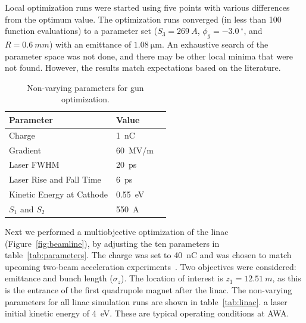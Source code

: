 Local optimization runs were started using five points 
with various 
differences from the optimum value. The optimization runs converged 
(in less than 100 function evaluations) to a parameter set ($S_3=\SI{269}{A}$,
$\phi_g=\SI{-3.0}{^{\circ}}$, and $R=\SI{0.6}{mm}$) with an emittance of $\SI{1.08}{\um}$.
An exhaustive search of the parameter space was not done, and there may be other local minima that were not found.
However, the results match expectations based on the literature. 
\begin{table}%
	\caption{\label{tab:gun} Non-varying parameters for gun optimization.}
	\begin{center}
		\begin{tabular}{lll}
			\toprule
			\textbf{Parameter} & \textbf{Value} \\
			\midrule
			Charge  & \SI{1}{nC} \\
			Gradient & \SI{60}{MV/m} \\
			Laser FWHM & \SI{20}{ps} \\
			Laser Rise and Fall Time & \SI{6}{ps} \\
			Kinetic Energy at Cathode  & \SI{0.55}{eV} \\
			$S_1$ and $S_2$ & \SI{550}{A} \\
			\bottomrule
		\end{tabular}
	\end{center}
\end{table}

\label{sec:linacopt}
Next we performed a multiobjective optimization of the linac (Figure~\ref{fig:beamline}), 
by adjusting the ten parameters in table~\ref{tab:parameters}. The charge was set to \SI{40}{nC}
and was chosen to match upcoming two-beam acceleration experiments~\cite{tba2017}. 
Two objectives were considered: emittance and bunch length ($\sigma_z$). 
The location of interest is $z_1=\SI{12.51}{m}$, as this is the entrance of the first 
quadrupole magnet after the linac.   The non-varying parameters for all linac simulation runs are shown in table~\ref{tab:linac}.    a laser  initial kinetic energy of \SI{4}{eV}. 
These are typical operating conditions at AWA. 


